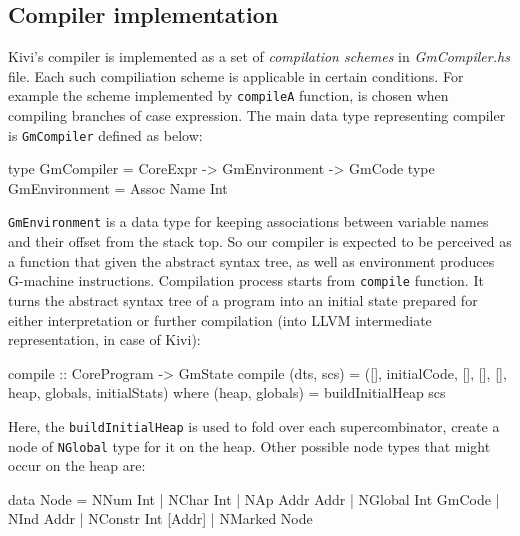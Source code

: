 \documentclass[12pt,a4paper]{report}
\begin{document}

%
%

\subsection{Compiler implementation}
Kivi's compiler is implemented as a set of \textit{compilation schemes} in
\textit{GmCompiler.hs} file. Each such compiliation scheme is applicable in
certain conditions. For example the scheme implemented by \texttt{compileA}
function, is chosen when compiling branches of case expression. The main data
type representing compiler is \texttt{GmCompiler} defined as below:

\vspace*{0.2in}
\begin{code}[style=haskell]
  type GmCompiler = CoreExpr -> GmEnvironment -> GmCode
  type GmEnvironment = Assoc Name Int
\end{code}

\texttt{GmEnvironment} is a data type for keeping associations between variable
names and their offset from the stack top. So our compiler is expected to be
perceived as a function that given the abstract syntax tree, as well as
environment produces G-machine instructions. Compilation process starts from
\texttt{compile} function. It turns the abstract syntax tree of a program into
an initial state prepared for either interpretation or further compilation (into
LLVM intermediate representation, in case of Kivi):

\vspace*{0.2in}
\begin{code}[style=haskell]
  compile :: CoreProgram -> GmState
  compile (dts, scs) = ([], initialCode, [], [], [], heap, globals, initialStats)
      where
          (heap, globals) = buildInitialHeap scs
\end{code}

Here, the \texttt{buildInitialHeap} is used to fold over each supercombinator,
create a node of \texttt{NGlobal} type for it on the heap. Other possible node
types that might occur on the heap are:

\vspace*{0.2in}
\begin{code}[style=haskell]
  data Node = NNum Int
            | NChar Int
            | NAp Addr Addr
            | NGlobal Int GmCode
            | NInd Addr
            | NConstr Int [Addr]
            | NMarked Node
\end{code}
\end{document}
